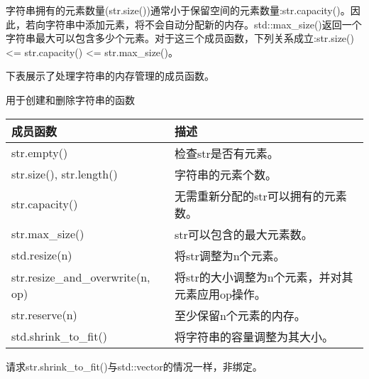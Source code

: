 字符串拥有的元素数量(str.size())通常小于保留空间的元素数量:str.capacity()。因此，若向字符串中添加元素，将不会自动分配新的内存。std::max\_size()返回一个字符串最大可以包含多少个元素。对于这三个成员函数，下列关系成立:str.size() <= str.capacity() <= str.max\_size()。

下表展示了处理字符串的内存管理的成员函数。

\begin{center}
用于创建和删除字符串的函数
\end{center}


\begin{longtable}[c]{|l|l|}
\hline
\textbf{成员函数} & \textbf{描述}                                  \\ \hline
\endfirsthead
%
\endhead
%
str.empty()               & 检查str是否有元素。                           \\ \hline
str.size(), str.length()  & 字符串的元素个数。                        \\ \hline
str.capacity()            & 无需重新分配的str可以拥有的元素数。 \\ \hline
str.max\_size()           & str可以包含的最大元素数。              \\ \hline
std.resize(n)             & 将str调整为n个元素。                             \\ \hline
str.resize\_and\_overwrite(n, op) & 将str的大小调整为n个元素，并对其元素应用op操作。 \\ \hline
str.reserve(n)            & 至少保留n个元素的内存。                \\ \hline
std.shrink\_to\_fit()     & 将字符串的容量调整为其大小。      \\ \hline
\end{longtable}

请求str.shrink\_to\_fit()与std::vector的情况一样，非绑定。


